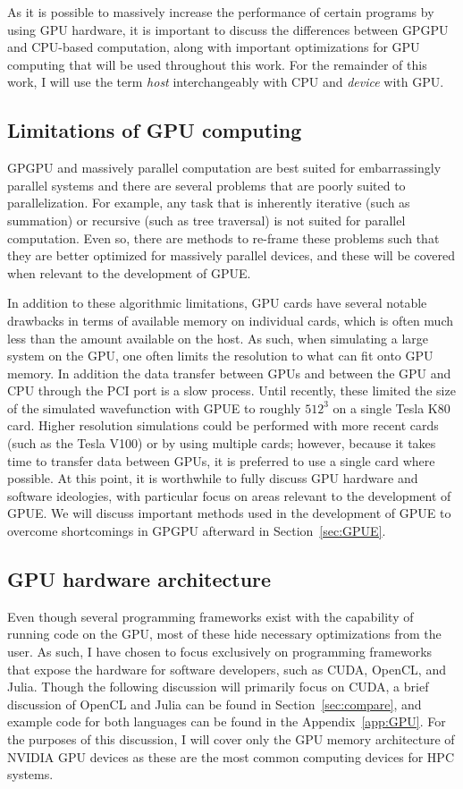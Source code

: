 As it is possible to massively increase the performance of certain programs by using GPU hardware, it is important to discuss the differences between GPGPU and CPU-based computation, along with important optimizations for GPU computing that will be used throughout this work.
For the remainder of this work, I will use the term \textit{host} interchangeably with CPU and \textit{device} with GPU.

\subsection{Limitations of GPU computing}

GPGPU and massively parallel computation are best suited for embarrassingly parallel systems and there are several problems that are poorly suited to parallelization.
For example, any task that is inherently iterative (such as summation) or recursive (such as tree traversal) is not suited for parallel computation.
Even so, there are methods to re-frame these problems such that they are better optimized for massively parallel devices, and these will be covered when relevant to the development of GPUE.

In addition to these algorithmic limitations, GPU cards have several notable drawbacks in terms of available memory on individual cards, which is often much less than the amount available on the host.
As such, when simulating a large system on the GPU, one often limits the resolution to what can fit onto GPU memory.
In addition the data transfer between GPUs and between the GPU and CPU through the PCI port is a slow process.
Until recently, these limited the size of the simulated wavefunction with GPUE to roughly $512^3$ on a single Tesla K80 card.
Higher resolution simulations could be performed with more recent cards (such as the Tesla V100) or by using multiple cards; however, because it takes time to transfer data between GPUs, it is preferred to use a single card where possible.
At this point, it is worthwhile to fully discuss GPU hardware and software ideologies, with particular focus on areas relevant to the development of GPUE.
We will discuss important methods used in the development of GPUE to overcome shortcomings in GPGPU afterward in Section~\ref{sec:GPUE}.

\subsection{GPU hardware architecture}

Even though several programming frameworks exist with the capability of running code on the GPU, most of these hide necessary optimizations from the user.
As such, I have chosen to focus exclusively on programming frameworks that expose the hardware for software developers, such as CUDA, OpenCL, and Julia.
Though the following discussion will primarily focus on CUDA, a brief discussion of OpenCL and Julia can be found in Section~\ref{sec:compare}, and example code for both languages can be found in the Appendix~\ref{app:GPU}.
For the purposes of this discussion, I will cover only the GPU memory architecture of NVIDIA GPU devices as these are the most common computing devices for HPC systems.

